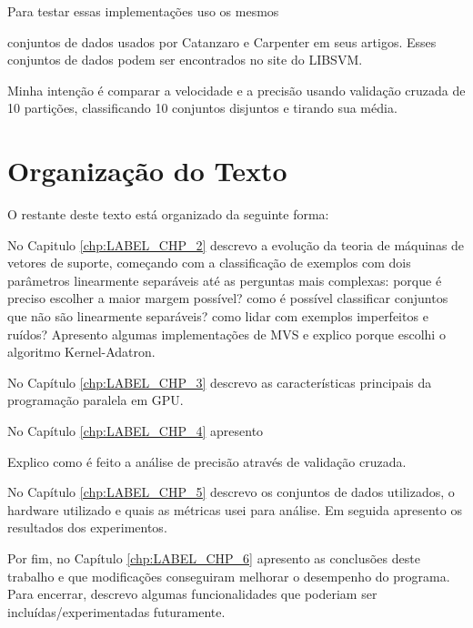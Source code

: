 Para testar essas implementações uso os mesmos 

conjuntos de dados usados por Catanzaro e Carpenter em seus artigos. Esses conjuntos de dados podem ser encontrados no site do LIBSVM. 

Minha intenção é comparar a velocidade e a precisão usando validação cruzada de 10 partições, classificando 10 conjuntos disjuntos e tirando sua média.

\section{Organização do Texto}\label{sec:LABEL_CHP_1_SEC_C}
O restante deste texto está organizado da seguinte forma: 
\par
No Capitulo \ref{chp:LABEL_CHP_2} descrevo a evolução da teoria de máquinas de vetores de suporte, começando com a classificação de exemplos com dois parâmetros linearmente separáveis até as perguntas mais complexas: porque é preciso escolher a maior margem possível? como é possível classificar conjuntos que não são linearmente separáveis? como lidar com exemplos imperfeitos e ruídos? Apresento algumas implementações de MVS e explico porque escolhi o algoritmo Kernel-Adatron.

No Capítulo \ref{chp:LABEL_CHP_3} descrevo as características principais da programação paralela em GPU.%

No Capítulo \ref{chp:LABEL_CHP_4} apresento 


Explico como é feito a análise de precisão através de validação cruzada. 


No Capítulo \ref{chp:LABEL_CHP_5} descrevo os conjuntos de dados utilizados, o hardware utilizado e quais as métricas usei para análise. Em seguida apresento os resultados dos experimentos.

Por fim, no Capítulo \ref{chp:LABEL_CHP_6} apresento as conclusões deste trabalho e que modificações conseguiram melhorar o desempenho do programa. Para encerrar, descrevo algumas funcionalidades que poderiam ser incluídas/experimentadas futuramente.